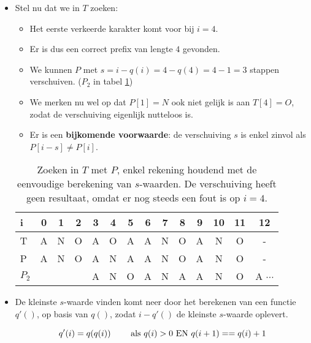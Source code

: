\begin{itemize}
\begin{itemize}
            \item Stel nu dat we in $T$ zoeken:
            \begin{itemize}
                \item Het eerste verkeerde karakter komt voor bij $i = 4$. 
                \item Er is dus een correct prefix van lengte $4$ gevonden.
                \item We kunnen $P$ met $s = i - q(i) = 4 - q(4) = 4 - 1 = 3$ stappen verschuiven. ($P_2$ in tabel \ref{table:kmp2})
                \item We merken nu wel op dat $P[1] = N$ ook niet gelijk is aan $T[4] = O$, zodat de verschuiving eigenlijk nutteloos is.
                \item Er is een \textbf{bijkomende voorwaarde}: de verschuiving $s$ is enkel zinvol als \\ $P[i - s] \neq P[i]$.
            \end{itemize}
                        
            \begin{table}[ht]
                \centering
                \begin{tabular}{l | c c c c c c c c c c c c c}
                    i  & 0 & 1 & 2 & 3 & 4 & 5 & 6 & 7 & 8 & 9 & 10 & 11 & 12  \\
                    \hline
                    T    & A & N & O & A & O & A & A & N & O & A & N  & O  & - \\
                    P    & A & N & O & A & N & A & A & N & O & A & N  & O  & - \\
                    $P_2$    &   &   &   & A & N & O & A & N & A & A & N  & O  & A  $\cdots$\\
                \end{tabular}
                \caption{Zoeken in $T$ met $P$, enkel rekening houdend met de eenvoudige berekening van $s$-waarden. De verschuiving heeft geen resultaat, omdat er nog steeds een fout is op $i = 4$.}
                \label{table:kmp2}
            \end{table}
           \item De kleinste $s$-waarde vinden komt neer door het berekenen van een functie $q'()$, op basis van $q()$, zodat $i - q'()$ de kleinste $s$-waarde oplevert.
            
           $$q'(i) = q(q(i)) \qquad \hbox{ als } q(i) > 0 \hbox{ EN } q(i + 1) == q(i) + 1$$
    \end{itemize}
\end{itemize}


